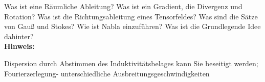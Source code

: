 \begin{question}[section=1,subsection=12,name={Räumliche Ableitung},difficulty=5,type=mdl,tags={}]
	Was ist eine Räumliche Ableitung? Was ist ein Gradient, die Divergenz und Rotation? Was ist die Richtungsableitung eines Tensorfeldes? Was sind die Sätze von Gauß und Stokes? Wie ist Nabla einzuführen? Was ist die Grundlegende Idee dahinter?
	\\ \textbf{Hinweis:}\\
	
\end{question}
\begin{solution}
	Dispersion durch Abstimmen des Induktivitätsbelages kann Sie beseitigt werden; Fourierzerlegung- unterschiedliche Ausbreitungsgeschwindigkeiten
\end{solution}